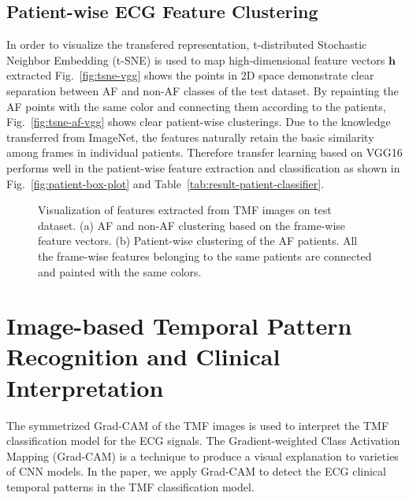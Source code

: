 \documentclass[journal]{IEEEtran}
\begin{document}
\subsection{Patient-wise ECG Feature Clustering}\label{clustering}
In order to visualize the transfered representation, t-distributed Stochastic Neighbor Embedding (t-SNE) \cite{tsne_2008} is used to map high-dimensional feature vectors $\mathbold{h}$ extracted 
Fig.~\ref{fig:tsne-vgg} shows the points in 2D space demonstrate clear separation between AF and non-AF classes of the test dataset. By repainting the AF points with the same color and connecting them according to the patients, Fig.~\ref{fig:tsne-af-vgg} shows clear patient-wise clusterings. Due to the knowledge transferred from ImageNet, the features naturally retain the basic similarity among frames in individual patients. 
Therefore transfer learning based on VGG16 performs well in the patient-wise feature extraction and classification as shown in Fig.~\ref{fig:patient-box-plot} and Table~\ref{tab:result-patient-classifier}.

\begin{figure*}[th]
  \centering
  \caption{Visualization of features extracted from TMF images on test dataset. (a) AF and non-AF clustering based on the frame-wise feature vectors. (b) Patient-wise clustering of the AF patients. All the frame-wise features belonging to the same patients are connected and painted  with the same colors.} \label{fig:tsne}
\end{figure*}


\section{Image-based Temporal Pattern Recognition and Clinical Interpretation}
\label{sec:interpret}

The symmetrized Grad-CAM of the TMF images is used to interpret the TMF classification model for the ECG signals. The Gradient-weighted Class Activation Mapping (Grad-CAM) \cite{Grad_CAM_2017} is a technique to produce a visual explanation to varieties of CNN models. In the paper, we apply Grad-CAM to detect the ECG clinical temporal patterns in the TMF classification model. 
\end{document}
